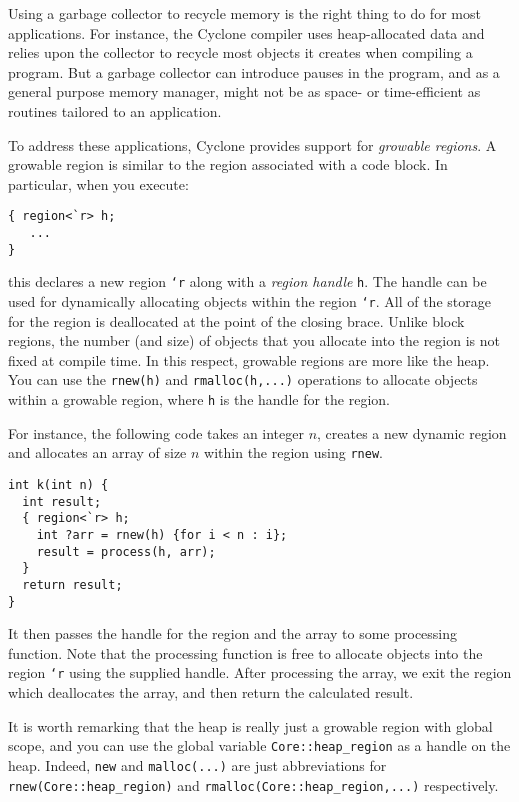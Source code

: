 Using a garbage collector to recycle memory is the right thing to do
for most applications.  For instance, the Cyclone compiler uses
heap-allocated data and relies upon the collector to recycle most
objects it creates when compiling a program. But a garbage collector
can introduce pauses in the program, and as a general purpose memory
manager, might not be as space- or time-efficient as routines tailored
to an application.

To address these applications, Cyclone provides support for \emph{growable
regions}.  A growable region is similar to the region associated with
a code block.  In particular, when you execute:
\begin{verbatim}
{ region<`r> h;
   ...
}
\end{verbatim}
this declares a new region \texttt{`r} along with a \emph{region handle}
\texttt{h}.  The handle can be used for dynamically allocating objects within
the region \texttt{`r}.  All of the storage for
the region is deallocated at the point of the closing brace.  
Unlike block
regions, the number (and size) of objects that you allocate into
the region is not fixed at compile time.  In this respect, growable
regions are more like the heap.  You can use the \texttt{rnew(h)} and
\texttt{rmalloc(h,...)} operations to allocate objects within a growable
region, where \texttt{h} is the handle for the region.
 
For instance, the following code takes an integer $n$, creates
a new dynamic region and allocates an array of size
$n$ within the region using \texttt{rnew}.  
\begin{verbatim}
int k(int n) {
  int result;
  { region<`r> h;
    int ?arr = rnew(h) {for i < n : i};
    result = process(h, arr);
  }
  return result;
}
\end{verbatim}
It then passes the
handle for the region and the array to some processing function.
Note that the processing function is free to allocate objects
into the region \texttt{`r} using the supplied handle.  
After processing the array, we exit the region which deallocates
the array, and then return the calculated result.

It is worth remarking that the heap is really just a growable region
with global scope, and you can use the global variable 
\texttt{Core::heap_region}
as a handle on the heap.  Indeed, \texttt{new} and \texttt{malloc(...)}
are just abbreviations for \texttt{rnew(Core::heap_region)} and
\texttt{rmalloc(Core::heap_region,...)} respectively.  


